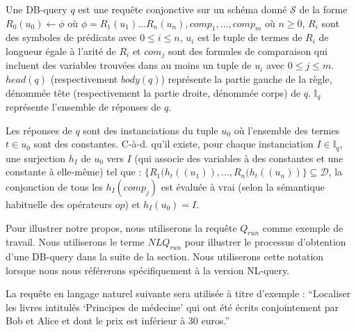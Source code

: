 \begin{definition}[DB-query]
    Une DB-query $q$ est une requête conjonctive sur un schéma donné $\mathcal{S}$ de la forme $R_0(u_0) \leftarrow \phi$ où $\phi = R_1(u_1) \dots  R_n(u_n), comp_1, \dots, comp_m$ où $n \geq 0$, $R_i$ sont des symboles de prédicats avec $0 \leq i \leq n$, $u_i$ est le tuple de termes de $R_i$ de longueur égale à l'arité de $R_i$ et $com_j$ sont des formules de comparaison qui incluent des variables trouvées dans au moins un tuple de $u_i$ avec $0 \leq j \leq m$.
    $head(q)$ (respectivement $body(q)$) représente la partie gauche de la règle, dénommée tête (respectivement la partie droite, dénommée corps) de $q$.
    $\mathbb{I}_q$ représente l'ensemble de réponses de $q$.
    
    Les réponses de $q$ sont des instanciations du tuple $u_0$ où l'ensemble des termes $t \in u_0$ sont des constantes.
    C-à-d. qu'il existe, pour chaque instanciation $I \in \mathbb{I}_q$, une surjection $h_I$ de $u_0$ vers $I$ (qui associe des variables à des constantes et une constante à elle-même) tel que : $\{R_1(h_t((u_1)), \dots, R_n(h_t((u_n))\} \subseteq \mathcal{D}$, la conjonction de tous les $h_I(comp_j)$ est évaluée à vrai (selon la sémantique habituelle des opérateurs $op$) et $h_I(u_0)= I$.

\end{definition}





Pour illustrer notre propos, nous utiliserons la requête $Q_{run}$ comme exemple de travail.
Nous utiliserons le terme $NLQ_{run}$ pour illustrer le processus d'obtention d'une DB-query dans la suite de la section.
Nous utiliserons cette notation lorsque nous nous référerons spécifiquement à la version NL-query.




La requête en langage naturel suivante sera utilisée à titre d'exemple : \enquote{Localiser les livres intitulés \enquote{Principes de médecine} qui ont été écrits conjointement par Bob et Alice et dont le prix est inférieur à 30 euros.}